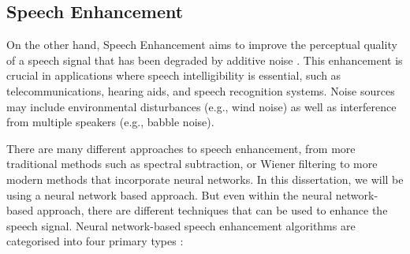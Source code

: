 \documentclass[logo,bsc,singlespacing,parskip,online]{infthesis}
\begin{document}

\subsection{Speech Enhancement}
On the other hand, Speech Enhancement aims to improve the perceptual quality of a speech signal that 
has been degraded by additive noise \citep{loizou_speech_2007}. 
This enhancement is crucial in applications where speech intelligibility is essential, such as telecommunications, hearing aids, and speech recognition systems. Noise sources may include environmental disturbances (e.g., wind noise) as well as interference from multiple speakers (e.g., babble noise).

There are many different approaches to speech enhancement, from more traditional methods such as spectral subtraction, or Wiener filtering
to more modern methods that incorporate neural networks. In this dissertation, we will be using a neural network based approach.
But even within the neural network-based approach, there are different techniques that can be used to enhance the speech signal. 
Neural network-based speech enhancement algorithms are categorised into four primary types \cite{katagiri_handbook_2000}:
\label{sec:se-methods}
\end{document}
